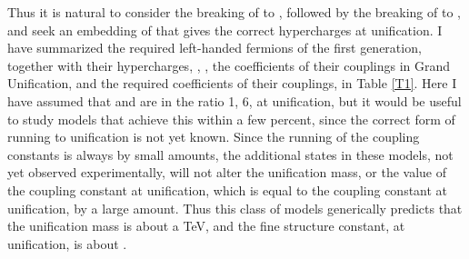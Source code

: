 \documentclass[a4paper,12pt,oneside]{article}
\begin{document}
Thus it is natural to consider the breaking of \coordHE{} to
\coordHE{}, 
followed by the breaking of \coordHE{} to
\coordHE{}, and seek an embedding of 
\coordHE{} that gives the correct hypercharges at 
unification.  I have summarized the required left-handed fermions of
the first generation, together with their hypercharges, \coordHE{}, 
\cite{Rosner}, the coefficients of their \coordHE{} couplings
in \coordHE{} Grand Unification, and the required coefficients
of their \coordHE{} couplings, in Table \ref{T1}.  Here I 
have assumed that \coordHE{} and \coordHE{} are in the
ratio 1, 6, at unification, but it would be useful to study models 
that achieve this within a few percent, since the correct form of 
running to unification is not yet known.  Since the running of the
coupling constants is always by small amounts, the additional states
in these models, not yet observed experimentally, will not alter the
unification mass, or the value of the \coordHE{} coupling
constant at unification, which is equal to the \coordHE{} 
coupling constant at unification, by a large amount.  Thus this 
class of models generically predicts that the unification mass is
about a TeV, and the \coordHE{} fine structure constant, at 
unification, is about \coordHE{}.
\end{document}
